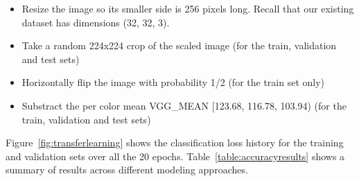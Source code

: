\begin{itemize}[noitemsep]
\item Resize the image so its smaller side is 256 pixels long. Recall that our existing dataset has dimensions (32, 32, 3).
\item Take a random 224x224 crop of the scaled image (for the train, validation and test sets)
\item Horizontally flip the image with probability 1/2 (for the train set only)
\item Substract the per color mean VGG\_MEAN [123.68, 116.78, 103.94) (for the train, validation and test sets)
\end{itemize}


Figure~\ref{fig:transferlearning} shows the classification loss history for the training and validation sets over all the 20 epochs. Table~\ref{table:accuracyresults} shows a summary of results across different modeling approaches.




